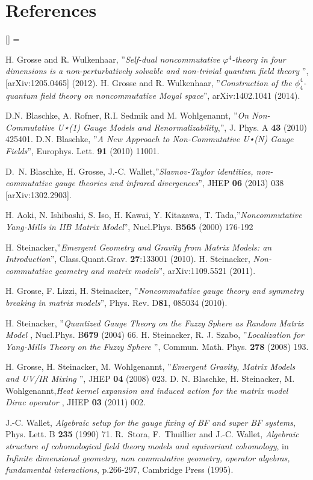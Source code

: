 \documentclass[a4paper]{jpconf}
\numberwithin{equation}{section}
\theoremstyle{nonumberplain}
\renewenvironment{thebibliography}[1]{%
\section*{References}%
\frenchspacing\small%
\begin{list}{[\arabic{enumi}]}%
{%
\usecounter{enumi}\parsep=2pt\topsep 0pt%
\settowidth{\labelwidth}{[#1]}%
\leftmargin=\labelwidth\advance\leftmargin\labelsep%
\rightmargin=0pt\itemsep=1pt\sloppy%
}%
}{\end{list}}
\begin{document}
\begin{thebibliography}{50}
 H. Grosse and R. Wulkenhaar, ''{\it{Self-dual noncommutative $\varphi^4$-theory in four dimensions is a non-perturbatively solvable and non-trivial quantum field theory}} '', [arXiv:1205.0465] (2012). H. Grosse and R. Wulkenhaar, ''{\it{Construction of the $\phi^4_4$-quantum field theory on noncommutative Moyal space}}'', arXiv:1402.1041 (2014).

 D.N. Blaschke, A. Rofner, R.I. Sedmik and M. Wohlgenannt, ''{\it{On Non-Commutative U⋆(1)
Gauge Models and Renormalizability}},'', J. Phys. A {\bf{43}} (2010) 425401. D.N. Blaschke, ''{\it{A New Approach to Non-Commutative U⋆(N) Gauge Fields}}'',
Europhys. Lett. {\bf{91}} (2010) 11001.

 D.~N. Blaschke, H. Grosse, J.-C. Wallet,''{\it{Slavnov-Taylor identities, non-commutative gauge theories and infrared divergences}}'', JHEP {\bf{06}} (2013) 038 [arXiv:1302.2903].

 H. Aoki, N. Ishibashi, S. Iso, H. Kawai, Y. Kitazawa, T. Tada,''{\it{Noncommutative Yang-Mills in IIB Matrix Model}}'', Nucl.Phys. B{\bf{565}} (2000) 176-192 

 H. Steinacker,''{\it{Emergent Geometry and Gravity from Matrix Models: an Introduction}}'', Class.Quant.Grav. {\bf{27}}:133001 (2010). H. Steinacker, {\it{Non-commutative geometry and matrix models}}'', arXiv:1109.5521 (2011).

 H. Grosse, F. Lizzi, H. Steinacker, ''{\it{Noncommutative gauge theory and symmetry breaking in matrix models}}'', Phys. Rev. D{\bf{81}}, 085034 (2010).

  H. Steinacker, ''{\it{Quantized Gauge Theory on the Fuzzy Sphere as Random Matrix Model }}, Nucl.Phys. B{\bf{679}} (2004) 66. H. Steinacker, R. J. Szabo, ''{\it{Localization for Yang-Mills Theory on the Fuzzy Sphere }}'', Commun. Math. Phys. {\bf{278}} (2008) 193.

 H. Grosse, H. Steinacker, M. Wohlgenannt, ''{\it{Emergent Gravity, Matrix Models and UV/IR Mixing }}'', JHEP {\bf{04}} (2008) 023. D. N. Blaschke, H. Steinacker, M. Wohlgenannt,{\it{Heat kernel expansion and induced action for the matrix model Dirac operator }}, JHEP {\bf{03}} (2011) 002.

 J.-C. Wallet, \textit{Algebraic setup for the gauge fixing of {BF} and super
  {BF} systems}, Phys. Lett. B {\bf{235}} (1990) 71. 
R.~Stora, F.~Thuillier and J.-C. Wallet, \textit{{Algebraic structure of
  cohomological field theory models and equivariant cohomology}}, {in
  \textit{Infinite dimensional geometry, non commutative geometry, operator
  algebras, fundamental interactions}, p.266-297, Cambridge Press (1995)}.


\end{thebibliography}
\end{document}

